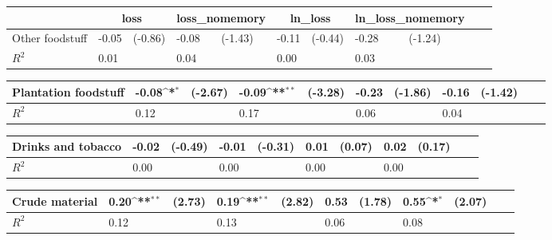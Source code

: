 \def\sym#1{\ifmmode^{#1}\else\(^{#1}\)\fi}
\begin{tabular}{p{4cm} p{1.4cm} p{1.2cm} p{1.5cm}  p{1.5cm} p{1.4cm} p{1.2cm} p{1.5cm} p{1.5cm}  p{1.5cm} p{1.5cm} }
                &\multicolumn{2}{c}{loss}    &\multicolumn{2}{c}{loss\_nomemory}&\multicolumn{2}{c}{ln\_loss} &\multicolumn{2}{c}{ln\_loss\_nomemory}\\
\hline
Other foodstuff &    -0.05         &  (-0.86)&    -0.08         &  (-1.43)&    -0.11         &  (-0.44)&    -0.28         &  (-1.24)\\
\hline
\(R^{2}\)       &     0.01         &         &     0.04         &         &     0.00         &         &     0.03         &         \\
\end{tabular}
\def\sym#1{\ifmmode^{#1}\else\(^{#1}\)\fi}
\begin{tabular}{p{4cm} p{1.4cm} p{1.2cm} p{1.5cm}  p{1.5cm} p{1.4cm} p{1.2cm} p{1.5cm} p{1.5cm}  p{1.5cm} p{1.5cm} }
\hline
Plantation foodstuff&    -0.08\sym{*}  &  (-2.67)&    -0.09\sym{**} &  (-3.28)&    -0.23         &  (-1.86)&    -0.16         &  (-1.42)\\
\hline
\(R^{2}\)       &     0.12         &         &     0.17         &         &     0.06         &         &     0.04         &         \\
\end{tabular}
\def\sym#1{\ifmmode^{#1}\else\(^{#1}\)\fi}
\begin{tabular}{p{4cm} p{1.4cm} p{1.2cm} p{1.5cm}  p{1.5cm} p{1.4cm} p{1.2cm} p{1.5cm} p{1.5cm}  p{1.5cm} p{1.5cm} }
\hline
Drinks and tobacco&    -0.02         &  (-0.49)&    -0.01         &  (-0.31)&     0.01         &   (0.07)&     0.02         &   (0.17)\\
\hline
\(R^{2}\)       &     0.00         &         &     0.00         &         &     0.00         &         &     0.00         &         \\
\end{tabular}
\def\sym#1{\ifmmode^{#1}\else\(^{#1}\)\fi}
\begin{tabular}{p{4cm} p{1.4cm} p{1.2cm} p{1.5cm}  p{1.5cm} p{1.4cm} p{1.2cm} p{1.5cm} p{1.5cm}  p{1.5cm} p{1.5cm} }
\hline
Crude material  &     0.20\sym{**} &   (2.73)&     0.19\sym{**} &   (2.82)&     0.53         &   (1.78)&     0.55\sym{*}  &   (2.07)\\
\hline
\(R^{2}\)       &     0.12         &         &     0.13         &         &     0.06         &         &     0.08         &         \\
\end{tabular}
